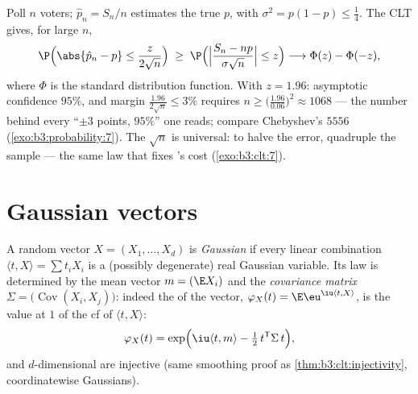 \begin{example}
\label{ex:b3:clt:confidence}
Poll $n$  voters; $\hat p_n = S_n/n$ estimates the
true $p$, with $\sigma^2 = p(1-p) \leq \frac14$. The CLT
gives, for large $n$,
\[
\P\Bigl(\abs{\hat p_n - p} \leq
\frac{z}{2\sqrt n}\Bigr)
\;\geq\; \P\Bigl(\Bigl|\frac{S_n - np}{\sigma\sqrt n}\Bigr|
\leq z\Bigr)
\longrightarrow \Phi(z) - \Phi(-z),
\]
where $\Phi$ is the standard  distribution function.
With $z = 1.96$: asymptotic confidence $95\%$, and margin
$\frac{1.96}{2\sqrt n} \leq 3\%$ requires $n \geq
\bigl(\frac{1.96}{0.06}\bigr)^2 \approx 1068$ --- the number
behind every ``$\pm3$ points, $95\%$'' one reads; compare
Chebyshev's $5556$ (\cref{exo:b3:probability:7}). The
$\sqrt n$ is universal: to halve the error, quadruple the
sample --- the same law that fixes 's cost
(\cref{exo:b3:clt:7}).
\end{example}

\section{Gaussian vectors}

\begin{definition}\label{def:b3:clt:gaussianvector}
A random vector $X = (X_1, \dots, X_d)$ is
\emph{Gaussian} if every linear
combination $\langle t, X\rangle = \sum t_iX_i$ is a
(possibly degenerate) real Gaussian variable. Its law is
determined by the mean vector $m = (\E X_i)$ and the
\emph{covariance matrix} $\Sigma = \bigl(\operatorname{Cov}
(X_i, X_j)\bigr)$: indeed the  of the
vector, $\varphi_X(t) = \E\eu^{\iu\langle t, X\rangle}$, is
the value at $1$ of the cf of $\langle t, X\rangle$:
\[
\varphi_X(t) = \exp\Bigl(\iu\langle t, m\rangle -
\tfrac12\,t^{\mathsf T}\Sigma\,t\Bigr),
\]
and $d$-dimensional  are injective
(same smoothing proof as \cref{thm:b3:clt:injectivity},
coordinatewise Gaussians).
\end{definition}

